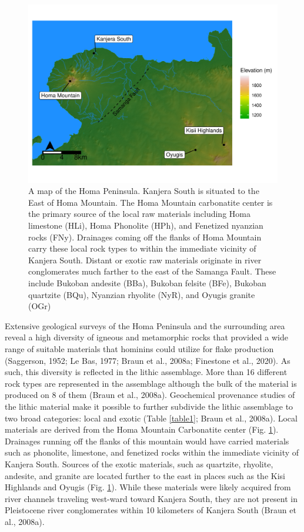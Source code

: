 \documentclass[]{elsarticle} %
\makeatletter
\def\maxwidth{\ifdim\Gin@nat@width>\linewidth\linewidth
\else\Gin@nat@width\fi}
\let\Oldincludegraphics\includegraphics
\renewcommand{\includegraphics}[1]{\Oldincludegraphics[width=\maxwidth]{#1}}
\makeatother
\begin{document}
\begin{figure}
\centering
\includegraphics{HUMEV-D-20-00115_revised_draft_files/figure-latex/fig-1-1.pdf}
\caption{A map of the Homa Peninsula. Kanjera South is situated to the
East of Homa Mountain. The Homa Mountain carbonatite center is the
primary source of the local raw materials including Homa limestone
(HLi), Homa Phonolite (HPh), and Fenetized nyanzian rocks (FNy).
Drainages coming off the flanks of Homa Mountain carry these local rock
types to within the immediate vicinity of Kanjera South. Distant or
exotic raw materials originate in river conglomerates much farther to
the east of the Samanga Fault. These include Bukoban andesite (BBa),
Bukoban felsite (BFe), Bukoban quartzite (BQu), Nyanzian rhyolite (NyR),
and Oyugis granite (OGr) \label{map}}
\end{figure}

Extensive geological surveys of the Homa Peninsula and the surrounding
area reveal a high diversity of igneous and metamorphic rocks that
provided a wide range of suitable materials that hominins could utilize
for flake production (Saggerson, 1952; Le Bas, 1977; Braun et al.,
2008a; Finestone et al., 2020). As such, this diversity is reflected in
the lithic assemblage. More than 16 different rock types are represented
in the assemblage although the bulk of the material is produced on 8 of
them (Braun et al., 2008a). Geochemical provenance studies of the lithic
material make it possible to further subdivide the lithic assemblage to
two broad categories: local and exotic (Table \ref{table1}; Braun et
al., 2008a). Local materials are derived from the Homa Mountain
Carbonatite center (Fig. \ref{map}). Drainages running off the flanks of
this mountain would have carried materials such as phonolite, limestone,
and fenetized rocks within the immediate vicinity of Kanjera South.
Sources of the exotic materials, such as quartzite, rhyolite, andesite,
and granite are located further to the east in places such as the Kisi
Highlands and Oyugis (Fig. \ref{map}). While these materials were likely
acquired from river channels traveling west-ward toward Kanjera South,
they are not present in Pleistocene river conglomerates within 10
kilometers of Kanjera South (Braun et al., 2008a).
\end{document}
